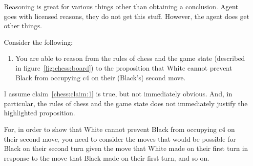 \documentclass[10pt]{article}
\newcommand{\hozlinedash}[0]{%
  \noindent\hdashrule[0.5ex][c]{\textwidth}{.1pt}{2.5pt}
}
\begin{document}
Reasoning is great for various things other than obtaining a conclusion.
Agent goes with licensed reasons, they do not get this stuff.
However, the agent does get other things.





\hozlinedash

Consider the following:
\begin{enumerate}
\item\label{chess:claim:1} You are able to reason from the rules of chess and the game state (described in figure~\ref{fig:chess:board}) to the proposition that White cannot prevent Black from occupying c4 on their (Black's) second move.
\end{enumerate}
I assume claim~\ref{chess:claim:1} is true, but not immediately obvious.
And, in particular, the rules of chess and the game state does not immediately justify the highlighted proposition.

For, in order to show that White cannot prevent Black from occupying c4 on their second move, you need to consider the moves that would be possible for Black on their second turn given the move that White made on their first turn in response to the move that Black made on their first turn, and so on.
\end{document}
